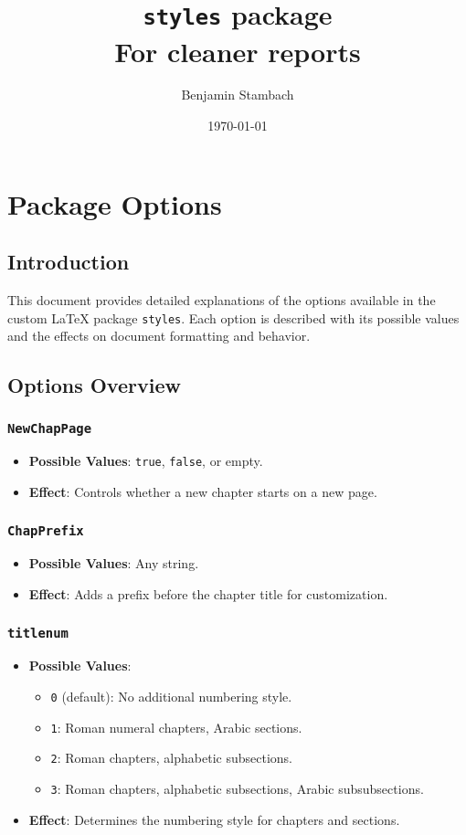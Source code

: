 \documentclass[12pt,twoside]{report}
\title{\texttt{styles} package \\ For cleaner reports}
\author{Benjamin Stambach}
\date{\today}
\begin{document}
\maketitle
\startbody
\listofappendixs

\chapter{Package Options}
\section*{Introduction}
This document provides detailed explanations of the options available in the custom LaTeX package \texttt{styles}. Each option is described with its possible values and the effects on document formatting and behavior.

\section{Options Overview}

\subsection{\texttt{NewChapPage}}
\begin{itemize}
    \item \textbf{Possible Values}: \texttt{true}, \texttt{false}, or empty.
    \item \textbf{Effect}: Controls whether a new chapter starts on a new page.
\end{itemize}

\subsection{\texttt{ChapPrefix}}
\begin{itemize}
    \item \textbf{Possible Values}: Any string.
    \item \textbf{Effect}: Adds a prefix before the chapter title for customization.
\end{itemize}

\subsection{\texttt{titlenum}}
\begin{itemize}
    \item \textbf{Possible Values}: 
    \begin{itemize}
        \item \texttt{0} (default): No additional numbering style.
        \item \texttt{1}: Roman numeral chapters, Arabic sections.
        \item \texttt{2}: Roman chapters, alphabetic subsections.
        \item \texttt{3}: Roman chapters, alphabetic subsections, Arabic subsubsections.
    \end{itemize}
    \item \textbf{Effect}: Determines the numbering style for chapters and sections.
\end{itemize}
\end{document}
